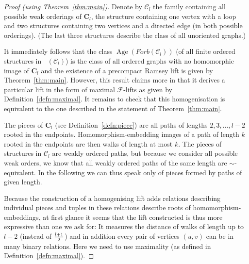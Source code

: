 \documentclass{elsarticle}
\def\Forb{\mathop{\mathrm{Forb_{he}}}\nolimits}
\def\Age{\mathop{\mathrm{Age}}\nolimits}
\def\str#1{\mathbf {#1}}
\def\F{{\mathcal F}}
\theoremstyle{plain}
\theoremstyle{definition}
\theoremstyle{remark}
\begin{document}
\begin{proof}[Proof (using Theorem~\ref{thm:main})]
Denote by $\mathcal C_l$ the family containing all possible weak orderings of $\str{C}_l$, the structure containing one vertex with a loop and two structures containing two vertices and a directed edge (in both possible orderings). (The last three structures describe the class of all unoriented graphs.)

It immediately follows that the class $\Age(Forb(\mathcal C_l))$ (of all 
 finite ordered structures in $\Forb(\mathcal C_l)$) is the class of all ordered graphs with no homomorphic image of $\str{C}_l$ and
the existence of a precompact Ramsey lift is given by Theorem~\ref{thm:main}.
However, this result claims more in that it derives a particular lift in the
form of maximal $\F$-lifts as given by Definition~\ref{defn:maximal}.
It remains to check that this homogenisation is equivalent to the one described in the
statement of Theorem~\ref{thm:main}.

The pieces of $\str{C}_l$ (see Definition~\ref{defn:piece}) are all paths of lengths $2, 3, \ldots, l-2$ rooted in
the endpoints. Homomorphism-embedding images of a path of length $k$ rooted in the endpoints are then walks of length at most $k$. The pieces of structures in $\mathcal C_l$ are weakly ordered paths, but because
we consider all possible weak orders, we know that all weakly ordered paths of the same length are $\sim$-equivalent. In the following we can thus
speak only of pieces formed by paths of given length.

Because the construction of a homogenising lift adds relations describing individual pieces and tuples in these relations describe roots of homomorphism-embeddings,
at first glance it seems that the lift constructed is thus more expressive than one we ask for:  It measures the distance of walks of length up to $l-2$
(instead of $l+1\over 2$) and in addition every pair of vertices $(u,v)$ can be in many binary relations.  Here we need to use maximality (as defined in Definition~\ref{defn:maximal}).


\end{proof}
\end{document}
